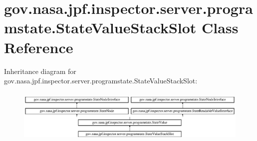 \hypertarget{classgov_1_1nasa_1_1jpf_1_1inspector_1_1server_1_1programstate_1_1_state_value_stack_slot}{}\section{gov.\+nasa.\+jpf.\+inspector.\+server.\+programstate.\+State\+Value\+Stack\+Slot Class Reference}
\label{classgov_1_1nasa_1_1jpf_1_1inspector_1_1server_1_1programstate_1_1_state_value_stack_slot}
Inheritance diagram for gov.\+nasa.\+jpf.\+inspector.\+server.\+programstate.\+State\+Value\+Stack\+Slot\+:\begin{figure}[H]
\begin{center}
\leavevmode
\includegraphics[height=2.592592cm]{classgov_1_1nasa_1_1jpf_1_1inspector_1_1server_1_1programstate_1_1_state_value_stack_slot}
\end{center}
\end{figure}
